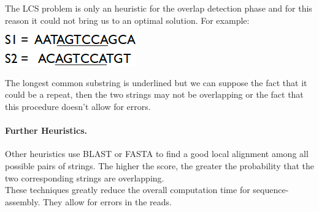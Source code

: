 The LCS problem is only an heuristic for the overlap detection phase and for this reason it could not bring us to an optimal solution. For example:
\begin{center}
	\includegraphics[width=0.22\columnwidth]{img/LCS_example}
\end{center}
The longest common substring is underlined but we can suppose the fact that it could be a repeat, then the two strings may not be overlapping or the fact that this procedure doesn't allow for errors.

\paragraph*{Further Heuristics.} Other heuristics use BLAST or FASTA to find a good local alignment among all possible pairs of strings. The higher the score, the greater the probability that the two corresponding strings are overlapping.\\
These techniques greatly reduce the overall computation time for sequence-assembly. They allow for errors in the reads.

